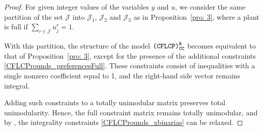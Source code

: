 \documentclass[preprint,11pt,authoryear]{elsarticle}
\def\J{\mathcal{J}}
\begin{document}
\begin{proof}
For given integer values of the variables $y$ and $u$, we consider the same partition of the set $\J$ into $\J_1$, $\J_2$ and $\J_3$ as in Proposition~\ref{pro: 3}, where a plant is full if $\sum_{r \in \J} u_j^r = 1$.

With this partition, the structure of the model ${\normalfont \texttt{(CFLCP)}_{\texttt{CC}}^\texttt{R}}$ becomes equivalent to that of Proposition~\ref{pro: 3}, except for the presence of the additional constraints \eqref{CFLCProunds_preferencesFull}. These constraints consist of inequalities with a single nonzero coefficient equal to 1, and the right-hand side vector remains integral.

Adding such constraints to a totally unimodular matrix preserves total unimodularity. Hence, the full constraint matrix remains totally unimodular, and by \cite[Proposition~2.3]{wolsey1999integer}, the integrality constraints \eqref{CFLCProunds_xbinarias} can be relaxed.
\end{proof}
\end{document}
